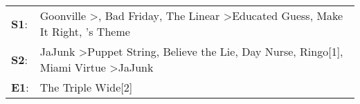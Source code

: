 \begin{supertabular}{p{0.03\textwidth}p{0.92\textwidth}}
 \textbf{S1}:  &  Goonville\textsuperscript{} \textgreater {}\textsuperscript{}, \enspace Bad Friday\textsuperscript{}, \enspace The Linear\textsuperscript{} \textgreater \enspace Educated Guess\textsuperscript{}, \enspace Make It Right\textsuperscript{}, 's Theme\textsuperscript{}  \enspace  \\
 \textbf{S2}:  &   JaJunk\textsuperscript{} \textgreater \enspace Puppet String\textsuperscript{}, \enspace Believe the Lie\textsuperscript{}, \enspace Day Nurse\textsuperscript{}, \enspace Ringo[1]\textsuperscript{}, \enspace Miami Virtue\textsuperscript{} \textgreater \enspace JaJunk\textsuperscript{}  \enspace  \\
 \textbf{E1}:  &                                                                                                                                                                                                                                                            The Triple Wide[2]\textsuperscript{}  \enspace  \\
\end{supertabular}
